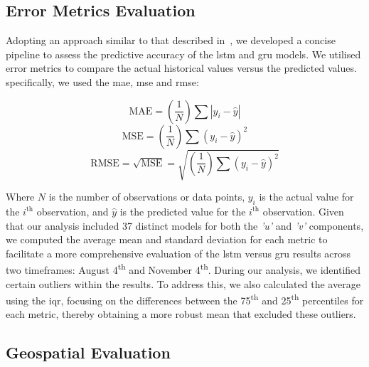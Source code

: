 \subsection{Error Metrics Evaluation}
\label{subsec:3.5.1}

Adopting an approach similar to that described in~\cite{49}, we developed a concise pipeline to assess the predictive accuracy of the \acrshort{lstm} and \acrshort{gru} models. We utilised error metrics to compare the actual historical values versus the predicted values. specifically, we used the \acrshort{mae}, \acrshort{mse} and \acrshort{rmse}:

\[
\text{MAE} = \left(\frac{1}{N}\right) \sum \left|y_i - \hat{y}\right|
\]
\[
\text{MSE} = \left(\frac{1}{N}\right) \sum \left(y_i - \hat{y}\right)^2
\]
\[
\text{RMSE} = \sqrt{\text{MSE}} = \sqrt{\left(\frac{1}{N}\right) \sum \left(y_i - \hat{y}\right)^2}
\]

Where $N$ is the number of observations or data points, $y_i$ is the actual value for the $i^\text{th}$ observation, and $\hat{y}$ is the predicted value for the $i^\text{th}$ observation. Given that our analysis included 37 distinct models for both the \textit{'u'} and \textit{'v'} components, we computed the average mean and standard deviation for each metric to facilitate a more comprehensive evaluation of the \acrshort{lstm} versus \acrshort{gru} results across two timeframes: August 4\textsuperscript{th} and November 4\textsuperscript{th}. During our analysis, we identified certain outliers within the results. To address this, we also calculated the average using the \acrshort{iqr}, focusing on the differences between the 75\textsuperscript{th} and 25\textsuperscript{th} percentiles for each metric, thereby obtaining a more robust mean that excluded these outliers.

\subsection{Geospatial Evaluation}
\label{subsec:3.5.2}

